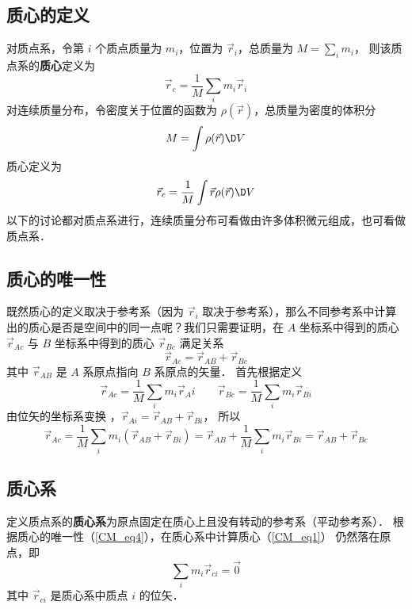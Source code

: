 

\subsection{质心的定义}

对质点系，令第 $i$ 个质点质量为 $m_i$，位置为 ${\vec r_i}$，总质量为 $M = \sum\limits_i m_i$， 则该质点系的\textbf{质心}定义为
\begin{equation}\label{CM_eq1}
{\vec r_c} = \frac{1}{M}\sum_i {{m_i}{{\vec r}_i}} 
\end{equation}
对连续质量分布，令密度关于位置的函数为 $\rho (\vec r)$，总质量为密度的体积分 %
\begin{equation}
M = \int {\rho (\vec r)\D V} 
\end{equation}
质心定义为
\begin{equation}
{\vec r_c} = \frac{1}{M}\int {\vec r\rho (\vec r)\D V}
\end{equation}
以下的讨论都对质点系进行，连续质量分布可看做由许多体积微元组成，也可看做质点系．

\subsection{质心的唯一性}
既然质心的定义取决于参考系（因为 $\vec r_i$ 取决于参考系），那么不同参考系中计算出的质心是否是空间中的同一点呢？我们只需要证明，在 $A$ 坐标系中得到的质心 $\vec r_{Ac}$ 与 $B$ 坐标系中得到的质心 $\vec r_{Bc}$ 满足关系
\begin{equation}\label{CM_eq4}
{\vec r_{Ac}} = {\vec r_{AB}} + {\vec r_{Bc}}
\end{equation}
其中 $\vec r_{AB}$ 是 $A$ 系原点指向 $B$ 系原点的矢量． 首先根据定义
\begin{equation}
\vec r_{Ac} = \frac{1}{M}\sum_i m_i \vec r_Ai  \qquad \vec r_{Bc} = \frac{1}{M}\sum_i  m_i \vec r_{Bi} 
\end{equation}
由位矢的坐标系变换%
，$\vec r_{Ai} = \vec r_{AB} + \vec r_{Bi}$， 所以
\begin{equation}
\vec r_{Ac} = \frac{1}{M}\sum_i m_i(\vec r_{AB} + \vec r_{Bi})  = \vec r_{AB} + \frac{1}{M} \sum_i m_i \vec r_{Bi}  = \vec r_{AB} + \vec r_{Bc}
\end{equation}
 
\subsection{质心系}
定义质点系的\textbf{质心系}为原点固定在质心上且没有转动的参考系（平动参考系）．%
根据质心的唯一性（\autoref{CM_eq4}），在质心系中计算质心（\autoref{CM_eq1}） 仍然落在原点，即
\begin{equation}\label{CM_eq7}
\sum_i m_i \vec r_{ci} = \vec 0
\end{equation}
其中 $\vec r_{ci}$ 是质心系中质点 $i$ 的位矢．

